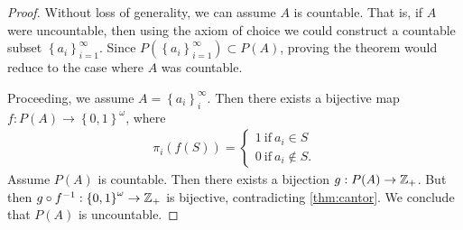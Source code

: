\begin{proof}
	Without loss of generality, we can assume $A$ is countable. That is, if $A$
	were uncountable, then using the axiom of choice we could construct a
	countable subset $\left\{ a_{i} \right\}_{i=1}^{\infty}$. Since 
	$P(\left\{ a_{i} \right\}_{i=1}^{\infty}) \subset P(A)$, proving the theorem
	would reduce to the case where $A$ was countable.

	Proceeding, we assume $A = \left\{ a_{i} \right\}_{i}^{\infty}$.
	Then there exists a bijective map $f: P(A) \to \left\{ 0,1 \right\}^{\omega}$,
	where 
	\begin{equation*}
		\begin{split}
			\pi_{i}(f(S)) = \begin{cases}
				1 \ \text{if} \  a_{i} \in S \\
				0 \ \text{if} \ a_{i} \not \in S.
			\end{cases}
		\end{split}
	\end{equation*}
	Assume $P(A)$ is countable. Then there exists a bijection $g: P(A) \to
	\mathbb{Z}_{+}$. But then $g\circ f^{-1}: \left\{ 0,1 \right\}^{\omega} \to
	\mathbb{Z}_{+}$ is bijective, contradicting \cref{thm:cantor}.
	We conclude that $P(A)$ is uncountable.
\end{proof}
